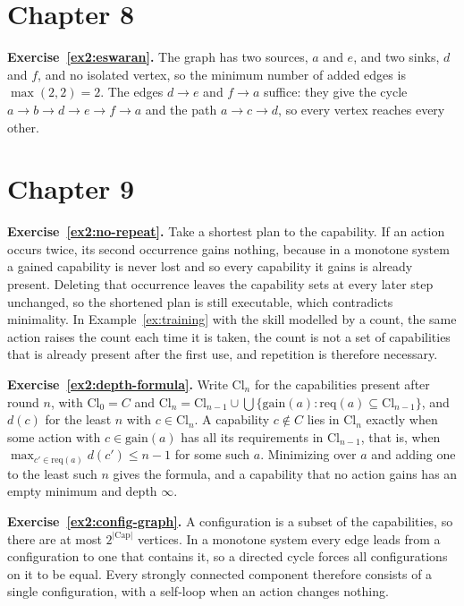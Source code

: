 \section*{Chapter 8}

\textbf{Exercise~\ref{ex2:eswaran}.} The graph has two sources, $a$ and $e$, and two sinks, $d$ and $f$, and no isolated vertex, so the minimum number of added edges is $\max(2,2)=2$. The edges $d\to e$ and $f\to a$ suffice: they give the cycle $a\to b\to d\to e\to f\to a$ and the path $a\to c\to d$, so every vertex reaches every other.

\section*{Chapter 9}

\textbf{Exercise~\ref{ex2:no-repeat}.} Take a shortest plan to the capability. If an action occurs twice, its second occurrence gains nothing, because in a monotone system a gained capability is never lost and so every capability it gains is already present. Deleting that occurrence leaves the capability sets at every later step unchanged, so the shortened plan is still executable, which contradicts minimality. In Example~\ref{ex:training} with the skill modelled by a count, the same action raises the count each time it is taken, the count is not a set of capabilities that is already present after the first use, and repetition is therefore necessary.

\textbf{Exercise~\ref{ex2:depth-formula}.} Write $\mathrm{Cl}_n$ for the capabilities present after round $n$, with $\mathrm{Cl}_0=C$ and $\mathrm{Cl}_{n}=\mathrm{Cl}_{n-1}\cup\bigcup\{\mathrm{gain}(a):\mathrm{req}(a)\subseteq\mathrm{Cl}_{n-1}\}$, and $d(c)$ for the least $n$ with $c\in\mathrm{Cl}_n$. A capability $c\notin C$ lies in $\mathrm{Cl}_n$ exactly when some action with $c\in\mathrm{gain}(a)$ has all its requirements in $\mathrm{Cl}_{n-1}$, that is, when $\max_{c'\in\mathrm{req}(a)}d(c')\le n-1$ for some such $a$. Minimizing over $a$ and adding one to the least such $n$ gives the formula, and a capability that no action gains has an empty minimum and depth $\infty$.

\textbf{Exercise~\ref{ex2:config-graph}.} A configuration is a subset of the capabilities, so there are at most $2^{|\mathrm{Cap}|}$ vertices. In a monotone system every edge leads from a configuration to one that contains it, so a directed cycle forces all configurations on it to be equal. Every strongly connected component therefore consists of a single configuration, with a self-loop when an action changes nothing.

